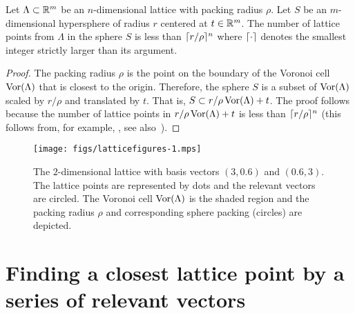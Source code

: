 \documentclass[final,leqno]{siamltex}
\begin{document}
\begin{proposition}\label{eq:latticepointsinsphere}
Let $\Lambda \subset {\mathbb R}^{m}$ be an $n$-dimensional lattice with packing radius $\rho$.  Let $S$ be an $m$-dimensional hypersphere of radius $r$ centered at $t \in {\mathbb R}^{m}$.  The number of lattice points from $\Lambda$ in the sphere $S$ is less than $\lceil r/\rho \rceil^{n}$ where $\lceil \cdot \rceil$ denotes the smallest integer strictly larger than its argument. 
 \end{proposition}
 \begin{proof}
The packing radius $\rho$ is the point on the boundary of the Voronoi cell $\operatorname{Vor}(\Lambda)$ that is closest to the origin. Therefore, the sphere $S$ is a subset of $\operatorname{Vor}(\Lambda)$ scaled by $r/\rho$ and translated by $t$.  That is, $S \subset r/\rho \operatorname{Vor}(\Lambda) + t$.  The proof follows because the number of lattice points in $r/\rho \operatorname{Vor}(\Lambda) + t$ is less than $\lceil r/\rho \rceil^n$ (this follows from, for example, \cite[Theorem~2]{ConwaySloane1992_voronoi_lattice_3d_obtuse_superbases}, see also~\cite[Lemma~3.7]{Micciancio09adeterministic}).
\end{proof}
 

 
\begin{figure}[tp] 
	\centering      
		\texttt{[image: figs/latticefigures-1.mps]} 
		\caption{The $2$-dimensional lattice with basis vectors $(3,0.6)$ and $(0.6,3)$.  The lattice points are represented by dots and the relevant vectors are circled.  The Voronoi cell $\operatorname{Vor}(\Lambda)$ is the shaded region and the packing radius $\rho$ and corresponding sphere packing (circles) are depicted.
}     
		\label{lattices:fig:vorregion}   
\end{figure} 



\section{Finding a closest lattice point by a series of relevant vectors} \label{sec:iterative-slicer}
\end{document}
